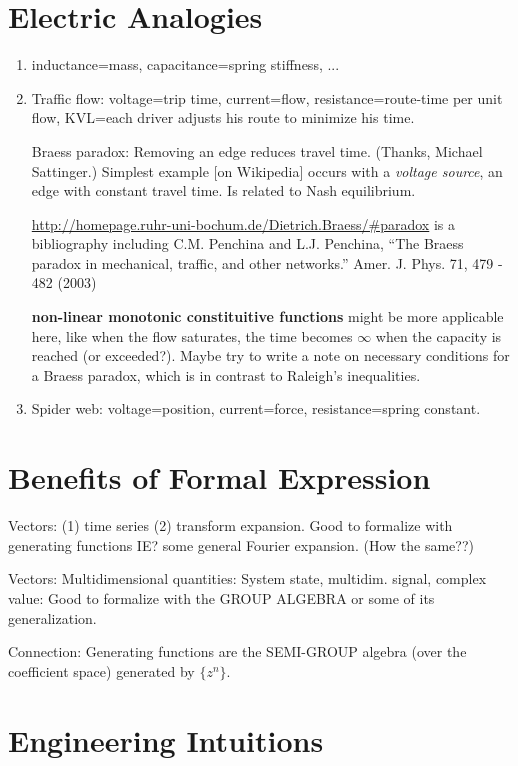 \documentclass{article}
\begin{document}
\section{Electric Analogies}

\begin{enumerate}
\item inductance=mass, capacitance=spring stiffness, ...
\item Traffic flow: voltage=trip time, current=flow, resistance=route-time 
per unit flow, KVL=each driver adjusts his route to minimize his time.

Braess paradox: Removing an edge reduces travel time. (Thanks, Michael 
Sattinger.)
Simplest example [on Wikipedia] occurs with a \textit{voltage source}, an edge
with constant travel time.  Is related to Nash equilibrium.

\url{http://homepage.ruhr-uni-bochum.de/Dietrich.Braess/#paradox}
is a bibliography including 
C.M. Penchina and L.J. Penchina,
   ``The Braess paradox in mechanical, traffic, and other networks.''
\cite{BraessAJPhy}
   Amer. J. Phys. 71, 479 - 482 (2003)

\textbf{non-linear monotonic constituitive functions} might be more applicable
here, like when the flow saturates, the time becomes $\infty$ when the capacity
is reached (or exceeded?).  Maybe try to write a note on necessary 
conditions for a Braess paradox, which is in contrast to Raleigh's 
inequalities.
 
\item Spider web: voltage=position, current=force, resistance=spring constant.
\end{enumerate}

\section{Benefits of Formal Expression}

Vectors: (1) time series (2) transform expansion.  Good to formalize with
generating functions IE? some general Fourier expansion.  (How the same??)

Vectors: Multidimensional quantities: System state, multidim. signal, complex
value:  Good to formalize with the GROUP ALGEBRA or some of its generalization.

Connection:  Generating functions are the 
SEMI-GROUP algebra (over the coefficient space)
generated by $\{ z^n \}$.


\section{Engineering Intuitions}
\end{document}
